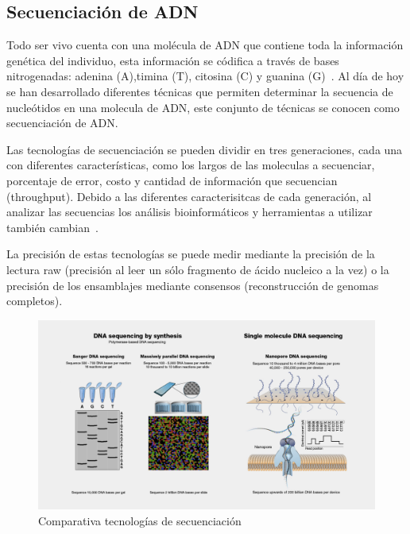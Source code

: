 \subsection{Secuenciación de ADN}
Todo ser vivo cuenta con una molécula de ADN que contiene toda la información genética del individuo, esta información se códifica a través de bases nitrogenadas: adenina (A),timina (T), citosina (C) y guanina (G)~\cite{watson1953molecular}. Al día de hoy se han desarrollado diferentes técnicas que permiten determinar la secuencia de nucleótidos en una molecula de ADN, este conjunto de técnicas se conocen como secuenciación de ADN.

Las tecnologías de secuenciación se pueden dividir en tres generaciones, cada una con diferentes características, como los largos de las moleculas a secuenciar, porcentaje de error, costo y cantidad de información que secuencian (throughput). Debido a las diferentes caracterisitcas de cada generación, al analizar las secuencias los análisis bioinformáticos y herramientas a utilizar también cambian~\cite{bierman2014understanding}.

La precisión de estas tecnologías se puede medir mediante la precisión de la lectura raw (precisión al leer un sólo fragmento de ácido nucleico a la vez) o la precisión de los ensamblajes mediante consensos (reconstrucción de genomas completos).

\begin{figure}[H]
    \centering
    \includegraphics[width=1\linewidth]{images/DNA-Sequencing.jpg}
    \caption{Comparativa tecnologías de secuenciación}
    \label{fig:DNA_sequencing}
\end{figure}


